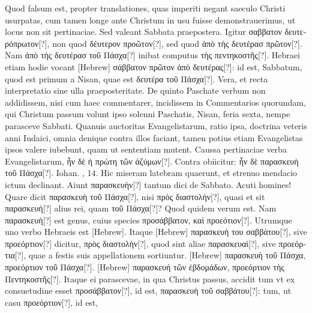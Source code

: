Quod falsum est,
propter translationes, quas imperiti negant saeculo Christi usurpatas,
cum tamen longe ante Christum in usu fuisse demonstrauerimus,
ut locus non sit pertinaciae.
%
Sed valeant Sabbata praepostera.
Igitur \textgreek{σαββατον δευτερόπρωτον[?]},
 non quod \textgreek{δέυτερον προῶτον[?]}, sed
quod \textgreek{ἀπὸ τὴς δευτέρασ πρῶτον[?]}.
Nam \textgreek{ἀπὸ τὴς δευτέρασ τοῦ Πάσχα[?]} inibat
computus \textgreek{τὴς πεντηκοστῆς[?]}.
Hebraei etiam hodie vocant \texthebrew{}[Hebrew]
\textgreek{σάββατον πρῶτον ἀπὸ δευτέρας[?]}: id est, Sabbatum, quod est primum a
 Nisan, quae est \textgreek{δευτέρα τοῦ Πάσχα[?]}.
Vera, et recta interpretatio sine ulla praeposteritate.
De quinto Paschate verbum non addidissem,
nisi cum haec commentarer, incidissem in Commentarios quorundam,
qui Christum passum volunt ipso solenni Paschatis, 
Nisan, feria sexta, nempe parasceve Sabbati.
Quanuis auctoritas
Evangelistarum, ratio ipsa, doctrina veteris anni Iudaici, omnia
denique contra illos faciant, tamen potius etiam Evangelistas ipsos
valere iubebunt, quam ut sententiam mutent.
Caussa pertinaciae
verba Evangelistarum, \textgreek{ἦν δὲ ἡ πρώτη τῶν ἀζύμων[?]}.
Contra obiicitur:
\textgreek{ἦν δὲ παρασκευὴ τοῦ Πάσχα[?]}.
Iohan. , 14.
Hic miseram latebram quaerunt,
et strenuo mendacio ictum declinant.
Aiunt \textgreek{παρασκευὴν[?]} tantum
dici de Sabbato.
Acuti homines!
Quare dicit \textgreek{παρασκευὴ τοῦ Πάσχα[?]},
nisi \textgreek{πρὸς διαστολήν[?]}, quasi et sit \textgreek{παρασκευὴ[?]}
 alius rei, quam \textgreek{τοῦ Πάσχα[?]}?
Quod quidem verum est.
Nam \textgreek{παρασκευὴ[?]} est genus, cuius species
\textgreek{προσάββατον, καὶ προεότιον[?]}.
Utrumque uno verbo Hebraeis est
\texthebrew{}[Hebrew].
Itaque \texthebrew{}[Hebrew] \textgreek{παρασκευὴ του σαββάτου[?]},
 sive \textgreek{προεόρτιον[?]} dicitur,
\textgreek{πρὸς διαστολὴν[?]}, quod sint aliae \textgreek{παρασκευαὶ[?]},
 sive \textgreek{προεόρτια[?]}, quae a festis
suis appellationem sortiuntur.
\texthebrew{}[Hebrew] \textgreek{παρασκευὴ τοῦ Πάσχα, προεόρτιον
τοῦ Πάσχα[?]}.
\texthebrew{}[Hebrew]
 \textgreek{παρασκευή τῶν ἑβδομάδων, προεόρτιον τὴς Πεντηκοστῆς[?]}.
Itaque ei parascevae, in qua Christus passus, accidit tum
vt ex consuetudine esset \textgreek{προσάββατον[?]}, id est,
 \textgreek{παρασκευὴ τοῦ σαββάτου[?]}:
tum, ut casu \textgreek{προεόρτιον[?]}, id est,
